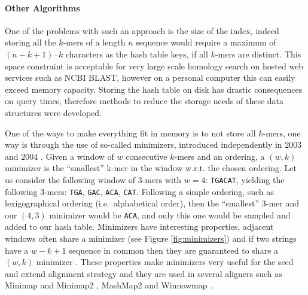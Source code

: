 \documentclass[
  11pt,
  twoside,
  BCOR=10mm,
  listof=totoc]{scrbook}
\begin{document}
\hypertarget{other-algorithms}{%
\paragraph{Other Algorithms}\label{other-algorithms}}

One of the problems with such an approach is the size of the index, indeed storing all the \(k\)-mers of a length \(n\) sequence would require a maximum of \((n-k + 1)\cdot k\) characters as the hash table keys, if all \(k\)-mers are distinct. This space constraint is acceptable for very large scale homology search on hosted web services such as NCBI BLAST, however on a personal computer this can easily exceed memory capacity. Storing the hash table on disk has drastic consequences on query times, therefore methods to reduce the storage needs of these data structures were developed.

One of the ways to make everything fit in memory is to not store all \(k\)-mers, one way is through the use of so-called minimizers, introduced independently in 2003 \autocite{schleimerWinnowingLocalAlgorithms2003} and 2004 \autocite{robertsReducingStorageRequirements2004}. Given a window of \(w\) consecutive \(k\)-mers and an ordering, a \((w,k)\) minimizer is the ``smallest'' k-mer in the window w.r.t. the chosen ordering. Let us consider the following window of \(3\)-mers with \(w=4\): \texttt{TGACAT}, yielding the following \(3\)-mers: \texttt{TGA}, \texttt{GAC}, \texttt{ACA}, \texttt{CAT}. Following a simple ordering, such as lexigographical ordering (i.e.~alphabetical order), then the ``smallest'' \(3\)-mer and our \((4,3)\) minimizer would be \texttt{ACA}, and only this one would be sampled and added to our hash table. Minimizers have interesting properties, adjacent windows often share a minimizer (see Figure \ref{fig:minimizers}) and if two strings have a \(w-k+1\) sequence in common then they are guaranteed to share a \((w,k)\) minimizer \autocite{robertsReducingStorageRequirements2004}. These properties make minimizers very useful for the seed and extend alignment strategy and they are used in several aligners such as Minimap \autocite{liMinimapMiniasmFast2016} and Minimap2 \autocite{liMinimap2PairwiseAlignment2018}, MashMap2 \autocite{jainFastAdaptiveAlgorithm2018} and Winnowmap \autocite{jainWeightedMinimizerSampling2020}.
\end{document}
